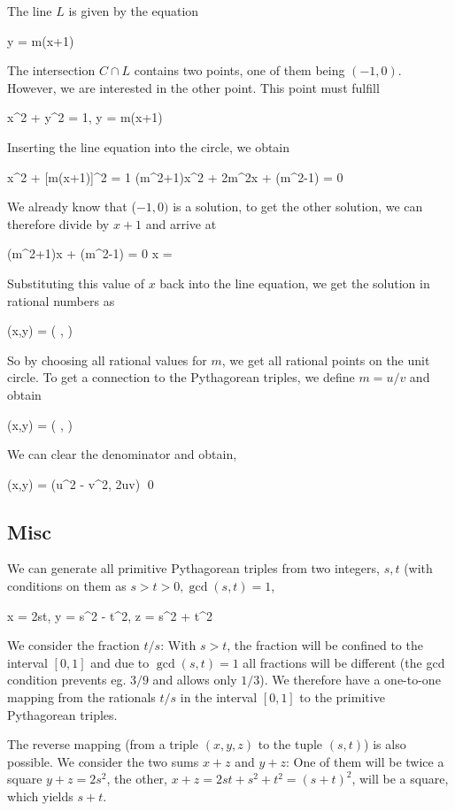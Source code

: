 The line $L$ is given by the equation

\bee
y = m(x+1)
\eee

The intersection $C \cap L$ contains two points, one of them being $(-1,0)$. However, we are interested in the other point. This point must fulfill

\bee
x^2 + y^2 = 1, \quad y = m(x+1)
\eee

Inserting the line equation into the circle, we obtain

\bee
x^2 + [m(x+1)]^2 = 1 \rightarrow (m^2+1)x^2 + 2m^2x + (m^2-1) = 0
\eee

We already know that ($-1,0)$ is a solution, to get the other solution, we can therefore divide by $x+1$ and arrive at

\bee
(m^2+1)x + (m^2-1) = 0 \rightarrow x = 
\eee

Substituting this value of $x$ back into the line equation, we get the solution in rational numbers as

\bee
(x,y) = \left( ,  \right)
\eee

So by choosing all rational values for $m$, we get all rational points on the unit circle. To get a connection to the Pythagorean triples, we define $m = u/v$ and obtain

\bee
(x,y) = \left( ,  \right)
\eee

We can clear the denominator and obtain,

\bee
(x,y) = (u^2 - v^2, 2uv) \qed
\eee

\subsection{Misc}

We can generate all primitive Pythagorean triples from two integers, $s, t$ (with conditions on them as $s > t > 0, \gcd(s,t)=1$,

\bee
x = 2st, \quad y = s^2 - t^2, \quad z = s^2 + t^2
\eee

We consider the fraction $t/s$: With $s > t$, the fraction will be confined to the interval $[0,1]$ and due to $\gcd(s,t) = 1$ all fractions will be different (the gcd condition prevents eg. $3/9$ and allows only $1/3$). We therefore have a one-to-one mapping from the rationals $t/s$ in the interval $[0,1]$ to the primitive Pythagorean triples.

The reverse mapping (from a triple $(x,y,z)$ to the tuple $(s,t)$) is also possible. We consider the two sums $x+z$ and $y+z$: One of them will be twice a square $y + z = 2s^2$, the other, $x + z = 2st + s^2 + t^2 = (s+t)^2$, will be a square, which yields $s+t$.

